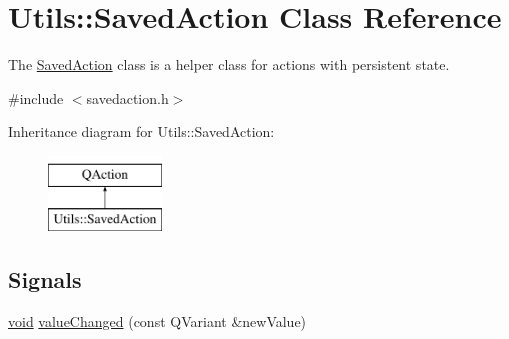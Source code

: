 \hypertarget{class_utils_1_1_saved_action}{\section{Utils\-:\-:Saved\-Action Class Reference}
\label{class_utils_1_1_saved_action}
}


The \hyperlink{class_utils_1_1_saved_action}{Saved\-Action} class is a helper class for actions with persistent state.  




{\ttfamily \#include $<$savedaction.\-h$>$}

Inheritance diagram for Utils\-:\-:Saved\-Action\-:\begin{figure}[H]
\begin{center}
\leavevmode
\includegraphics[height=2.000000cm]{class_utils_1_1_saved_action}
\end{center}
\end{figure}
\subsection*{Signals}
\begin{DoxyCompactItemize}
\item 
\hyperlink{group___u_a_v_objects_plugin_ga444cf2ff3f0ecbe028adce838d373f5c}{void} \hyperlink{class_utils_1_1_saved_action_a7b6126c479043f004cc924df0fc5f8c5}{value\-Changed} (const Q\-Variant \&new\-Value)
\end{DoxyCompactItemize}
